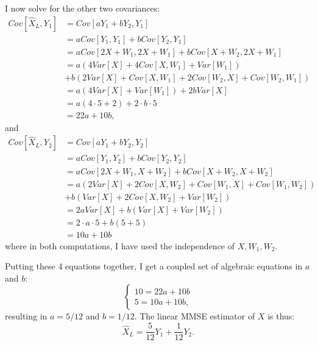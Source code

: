 \begin{problem}{8}
I now solve for the other two covariances:
\begin{align*}
Cov[\hat X_L, Y_1] &= Cov[aY_1+bY_2, Y_1] \\
& =   aCov[Y_1, Y_1]+bCov[Y_2, Y_1] \\
& = aCov[2X+W_1, 2X+W_1]+b Cov[X+W_2, 2X+W_1] \\
& = a(4Var[X]+4Cov[X, W_1]+Var[W_1])\\
&+b(2Var[X]+Cov[X, W_1]+2Cov[W_2, X]+Cov[W_2, W_1]) \\
& = a(4Var[X]+Var[W_1])+2bVar[X] \\
& = a(4\cdot5+2)+2\cdot b \cdot5 \\
& = 22a+10b,
\end{align*}
and 
\begin{align*}
Cov[\hat X_L, Y_2] &= Cov[aY_1+bY_2, Y_2] \\
& =   aCov[Y_1, Y_2]+bCov[Y_2, Y_2] \\
& = aCov[2X+W_1, X+W_2]+b Cov[X+W_2, X+W_2] \\
& = a(2Var[X]+2Cov[X, W_2]+Cov[W_1, X]+Cov[W_1, W_2])\\
&+b(Var[X]+2Cov[X, W_2]+Var[W_2]) \\
& = 2aVar[X]+b(Var[X]+Var[W_2]) \\
& = 2\cdot a\cdot 5+b(5+5) \\
& = 10a+10b
\end{align*}
where in both computations, I have used the independence of $X, W_1, W_2$. 

Putting these 4 equations together, I get a coupled set of algebraic equations in $a$ and $b$:
  \[
\left\{
                \begin{array}{ll}
10 = 22a+10b \\
5= 10a+10b,
                \end{array}
              \right.
  \]
resulting in $a = 5/12$ and $b = 1/12.$  The linear MMSE estimator of $X$ is thus:
\begin{equation*}
\hat X_L = \frac{5}{12}Y_1+\frac{1}{12}Y_2.
\end{equation*}


\end{problem}

